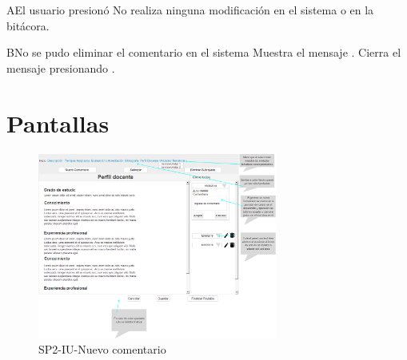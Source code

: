 
\label{SP2-CU16-A}
\begin{UCtrayectoriaA}{A}{El usuario presionó }
  \UCpaso No realiza ninguna modificación en el sistema o en la bitácora.
\end{UCtrayectoriaA}

\label{SP2-CU16-B}
\begin{UCtrayectoriaA}{B}{No se pudo eliminar el comentario en el sistema}
  \UCpaso Muestra el mensaje .
  \UCpaso[\UCactor] Cierra el mensaje presionando .
\end{UCtrayectoriaA}


\chapter{Pantallas}
 \begin{figure}
  \centering
    \includegraphics[width=0.7\textwidth]{DCU/SP2/Pantallas/Nuevo_comentario}
  \caption{SP2-IU-Nuevo comentario}
  \label{SP2-IU-Nuevo_comentario}
\end{figure}
